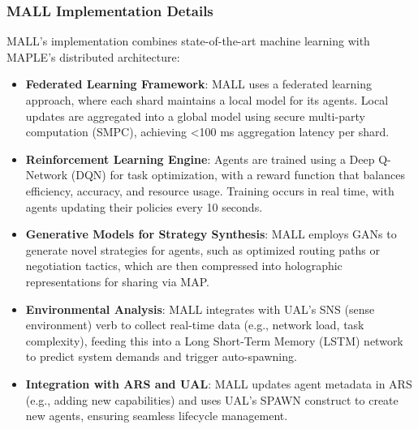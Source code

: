 \documentclass[a4paper,11pt]{article}
\begin{document}
\subsubsection{MALL Implementation Details}
MALL’s implementation combines state-of-the-art machine learning with MAPLE’s distributed architecture:
\begin{itemize}[leftmargin=*]
    \item \textbf{Federated Learning Framework}: MALL uses a federated learning approach, where each shard maintains a local model for its agents. Local updates are aggregated into a global model using secure multi-party computation (SMPC), achieving <100 ms aggregation latency per shard.
    \item \textbf{Reinforcement Learning Engine}: Agents are trained using a Deep Q-Network (DQN) for task optimization, with a reward function that balances efficiency, accuracy, and resource usage. Training occurs in real time, with agents updating their policies every 10 seconds.
    \item \textbf{Generative Models for Strategy Synthesis}: MALL employs GANs to generate novel strategies for agents, such as optimized routing paths or negotiation tactics, which are then compressed into holographic representations for sharing via MAP.
    \item \textbf{Environmental Analysis}: MALL integrates with UAL’s SNS (sense environment) verb to collect real-time data (e.g., network load, task complexity), feeding this into a Long Short-Term Memory (LSTM) network to predict system demands and trigger auto-spawning.
    \item \textbf{Integration with ARS and UAL}: MALL updates agent metadata in ARS (e.g., adding new capabilities) and uses UAL’s SPAWN construct to create new agents, ensuring seamless lifecycle management.
\end{itemize}
\end{document}
